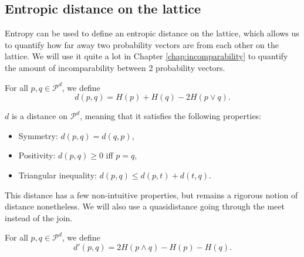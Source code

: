 \subsection{Entropic distance on the lattice} \label{sec:entropic_distances}

Entropy can be used to define an entropic distance on the lattice, which allows us to quantify how far away two probability vectors are from each other on the lattice. We will use it quite a lot in Chapter \ref{chap:incomparability} to quantify the amount of incomparability between 2 probability vectors.

\begin{definition} \label{def:entropic_distance}
    For all $p, q \in \mathcal{P}^d$, we define
    \begin{equation}
        d(p, q) = H(p) + H(q) - 2H(p \vee q).
    \end{equation}
\end{definition}

\begin{theorem}
    $d$ is a distance on $\mathcal{P}^d$, meaning that it satisfies the following properties:
    \begin{itemize}
        \item Symmetry: $d(p, q) = d(q, p)$,
        \item Positivity: $d(p, q) \geq 0$  iff $p = q$,
        \item Triangular inequality: $d(p, q) \leq d(p, t) + d(t, q)$.
    \end{itemize}
\end{theorem}

This distance has a few non-intuitive properties, but remains a rigorous notion of distance nonetheless. %
We will also use a quasidistance going through the meet instead of the join.

\begin{definition} \label{def:entropic_quasidistance}
    For all $p, q \in \mathcal{P}^d$, we define
    \begin{equation}
        d'(p, q) = 2H(p \wedge q) - H(p) - H(q).
    \end{equation}
\end{definition}

